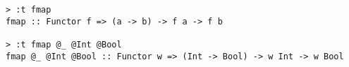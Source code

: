 \begin{repl}\begin{lstlisting}
> :t fmap
fmap :: Functor f => (a -> b) -> f a -> f b

> :t fmap @_ @Int @Bool
fmap @_ @Int @Bool :: Functor w => (Int -> Bool) -> w Int -> w Bool\end{lstlisting}\end{repl}
